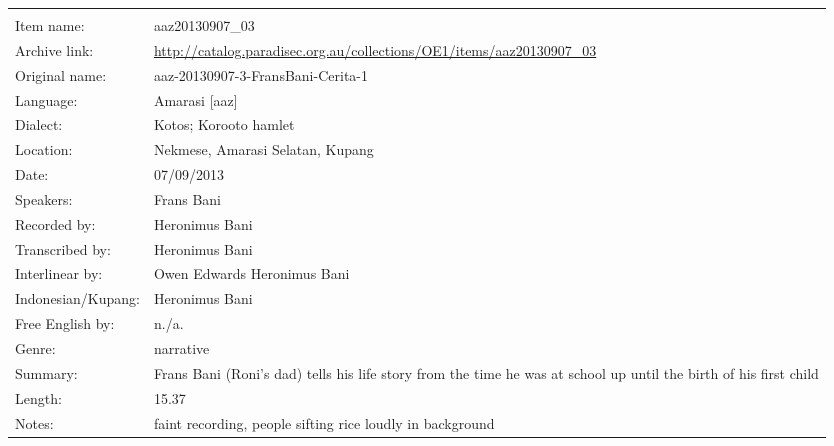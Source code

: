 \newpage
\noindent
\wg\begin{tabular}{lL{.67\textwidth}}
			& \\
Item name:			& aaz20130907{\_}03\\
Archive link:			& \url{http://catalog.paradisec.org.au/collections/OE1/items/aaz20130907_03}\\
Original name:			& aaz-20130907-3-FransBani-Cerita-1\\
Language:				& Amarasi [aaz] \\
Dialect:				& Kotos; Koro{\Q}oto hamlet \\
Location:				& Nekmese{\Q}, Amarasi Selatan, Kupang \\
Date:				& 07/09/2013\\
Speakers:				& Frans Bani\\
Recorded by:			& Heronimus Bani\\
Transcribed by:		& Heronimus Bani\\
Interlinear by:		& Owen Edwards Heronimus Bani\\
Indonesian/Kupang:		& Heronimus Bani\\
Free English by:		& n./a.\\
Genre:				& narrative\\
Summary:				& Frans Bani (Roni's dad) tells his life story from the time he was at school up until the birth of his first child\\
Length:				& 15.37\\
Notes:				& faint recording, people sifting rice loudly in background\\
\end{tabular}

